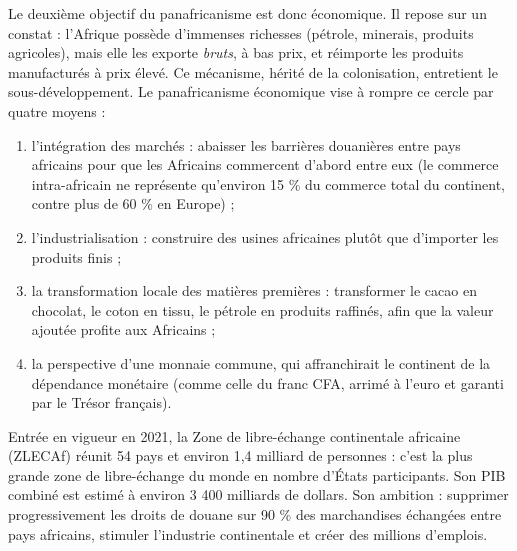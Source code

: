 \documentclass[11pt]{article}
\newcommand{\cle}[1]{{\popxbold\color{popdark}#1}}
\begin{document}
Le deuxième objectif du panafricanisme est donc économique. Il repose sur un constat : l'Afrique possède d'immenses richesses (pétrole, minerais, produits agricoles), mais elle les exporte \emph{bruts}, à bas prix, et réimporte les produits manufacturés à prix élevé. Ce mécanisme, hérité de la colonisation, entretient le sous-développement. Le panafricanisme économique vise à rompre ce cercle par quatre moyens :
\begin{enumerate}
\item l'\cle{intégration des marchés} : abaisser les barrières douanières entre pays africains pour que les Africains commercent d'abord entre eux (le commerce intra-africain ne représente qu'environ 15 \% du commerce total du continent, contre plus de 60 \% en Europe) ;
\item l'\cle{industrialisation} : construire des usines africaines plutôt que d'importer les produits finis ;
\item la \cle{transformation locale des matières premières} : transformer le cacao en chocolat, le coton en tissu, le pétrole en produits raffinés, afin que la valeur ajoutée profite aux Africains ;
\item la perspective d'une \cle{monnaie commune}, qui affranchirait le continent de la dépendance monétaire (comme celle du franc CFA, arrimé à l'euro et garanti par le Trésor français).
\end{enumerate}

\begin{exemplebox}
Entrée en vigueur en 2021, la \cle{Zone de libre-échange continentale africaine} (ZLECAf) réunit 54 pays et environ 1,4 milliard de personnes : c'est la plus grande zone de libre-échange du monde en nombre d'États participants. Son PIB combiné est estimé à environ 3 400 milliards de dollars. Son ambition : supprimer progressivement les droits de douane sur 90 \% des marchandises échangées entre pays africains, stimuler l'industrie continentale et créer des millions d'emplois.
\end{exemplebox}
\end{document}
